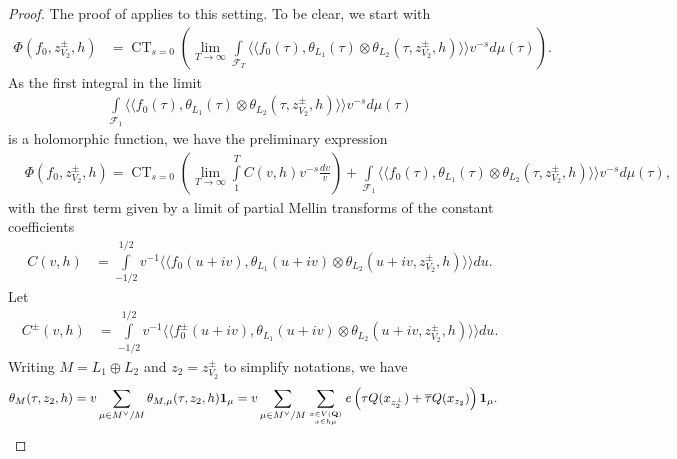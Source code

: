 \documentclass{amsart}
\theoremstyle{definition}
\begin{document}
\begin{proof}  

The proof of \cite[Proposition 2.5]{KuBL} applies to this setting. To be clear, we start with
\begin{equation*}\begin{aligned} \Phi(f_{0}, z_{V_2}^{\pm}, h) 
&=\operatorname{CT}_{s =0} \left( \lim_{T \rightarrow \infty} \int\limits_{\mathcal{F}_T} 
\langle \langle f_0(\tau), \theta_{L_{1}}(\tau) \otimes \theta_{L_{2}}(\tau, z_{V_2}^{\pm}, h) \rangle \rangle v^{-s} d \mu (\tau) \right). \end{aligned}\end{equation*}
As the first integral in the limit
\begin{align*} \int\limits_{ \mathcal{F}_1} \langle \langle f_0(\tau), \theta_{L_1}(\tau) \otimes \theta_{L_2}(\tau, z_{V_2}^{\pm}, h) \rangle \rangle 
v^{-s} d \mu (\tau) \end{align*}
is a holomorphic function, we have the preliminary expression
\begin{equation}\begin{aligned}\label{prelim} &\Phi(f_0, z_{V_2}^{\pm}, h) 
= \operatorname{CT}_{s =0} \left( \lim_{ T \rightarrow \infty} \int\limits_1^T C(v, h) v^{-s} \frac{dv}{v} \right) + 
\int\limits_{ \mathcal{F}_1} \langle \langle f_0(\tau), \theta_{L_1}(\tau) \otimes \theta_{L_2}(\tau, z_{V_2}^{\pm}, h) \rangle \rangle v^{-s} d \mu (\tau), \end{aligned}\end{equation}
with the first term given by a limit of partial Mellin transforms of the constant coefficients
\begin{align*} C(v, h) &= \int\limits_{-1/2}^{1/2} v^{-1}
\langle \langle f_{0}(u+iv), \theta_{L_1}(u + iv) \otimes \theta_{L_2}(u + iv, z_{V_2}^{\pm}, h) \rangle \rangle du. \end{align*}
Let 
\begin{align*} C^{\pm}(v, h) &= \int\limits_{-1/2}^{1/2} v^{-1}
\langle \langle f^{\pm}_{0}(u+iv), \theta_{L_1}(u + iv) \otimes \theta_{L_2}(u + iv, z_{V_2}^{\pm}, h)\rangle \rangle du. \end{align*}
Writing $M = L_{1} \oplus L_{2}$ and $z_2 = z_{V_2}^{\pm}$ to simplify notations, we have 
\begin{align*} \theta_{M}(\tau, z_{2}, h) &= v \sum\limits_{\mu \in M^{\vee}/M} \theta_{M, \mu}(\tau, z_{2}, h) {\bf{1}}_{\mu} =
 v \sum\limits_{\mu \in M^{\vee}/M} \sum\limits_{x \in V({\bf{Q}}) \atop x \in h \mu} 
 e \left( \tau Q(x_{z_2^{\perp}}) + \overline{\tau} Q(x_{z_2}) \right) {\bf{1}}_{\mu}.\end{align*}

\end{proof}
\end{document}
